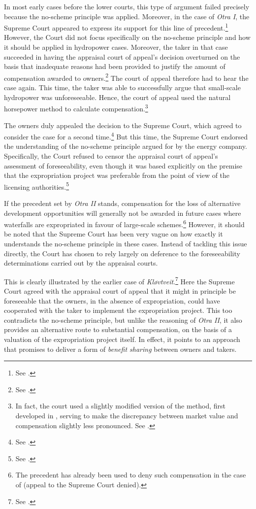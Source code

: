 In most early cases before the lower courts, this type of argument failed precisely because the no-scheme principle was applied. Moreover, in the case of {\it Otra I}, the Supreme Court appeared to express its support for this line of precedent.\footnote{See \cite[31-48]{otra10}.} However, the Court did not focus specifically on the no-scheme principle and how it should be applied in hydropower cases. Moreover, the taker in that case succeeded in having the appraisal court of appeal's decision overturned on the basis that inadequate reasons had been provided to justify the amount of compensation awarded to owners.\footnote{See \cite[52]{otra10}.} The court of appeal therefore had to hear the case again. This time, the taker was able to successfully argue that small-scale hydropower was unforeseeable. Hence, the court of appeal used the natural horsepower method to calculate compensation.\footnote{In fact, the court used a slightly modified version of the method, first developed in \cite{sauda09}, serving to make the discrepancy between market value and compensation slightly less pronounced. See \cite{otra12}.} 

The owners duly appealed the decision to the Supreme Court, which agreed to consider the case for a second time.\footnote{See \cite{otra13}.} But this time, the Supreme Court endorsed the understanding of the no-scheme principle argued for by the energy company. Specifically, the Court refused to censor the appraisal court of appeal's assessment of foreseeability, even though it was based explicitly on the premise that the expropriation project was preferable from the point of view of the licensing authorities.\footnote{See \cite[53-54]{otra13}.}

If the precedent set by {\it Otra II} stands, compensation for the loss of alternative development opportunities will generally not be awarded in future cases where waterfalls are expropriated in favour of large-scale schemes.\footnote{The precedent has already been used to deny such compensation in the case of \cite{smibelg15} (appeal to the Supreme Court denied).} However, it should be noted that the Supreme Court has been very vague on how exactly it understands the no-scheme principle in these cases. Instead of tackling this issue directly, the Court has chosen to rely largely on deference to the foreseeability determinations carried out by the appraisal courts.

This is clearly illustrated by the earlier case of {\it Kløvtveit}.\footnote{See \cite{klovtveit11}.} Here the Supreme Court agreed with the appraisal court of appeal that it might in principle be foreseeable that the owners, in the absence of expropriation, could have cooperated with the taker to implement the expropriation project. This too contradicts the no-scheme principle, but unlike the reasoning of {\it Otra II}, it also provides an alternative route to substantial compensation, on the basis of a valuation of the expropriation project itself. In effect, it points to an approach that promises to deliver a form of {\it benefit sharing} between owners and takers. 

